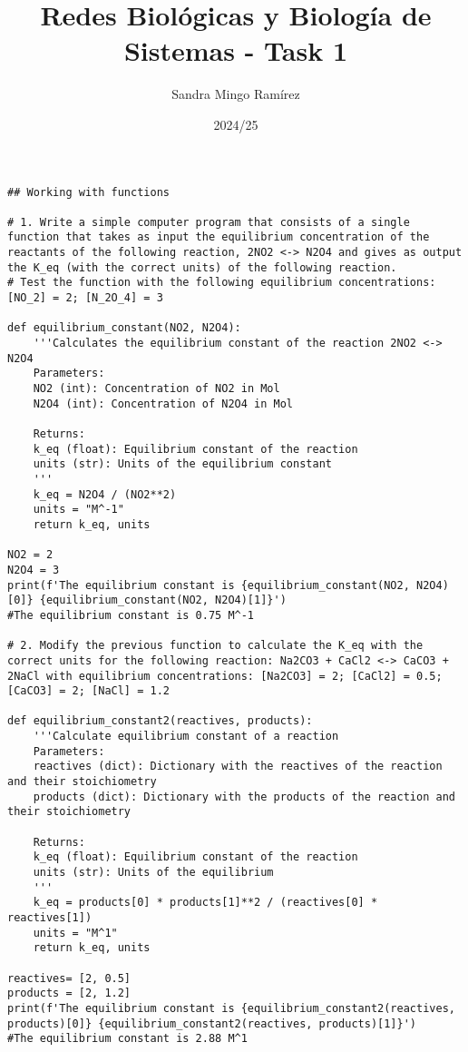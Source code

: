 \documentclass[nochap]{../config/ejercicios}
\title{Redes Biológicas y Biología de Sistemas - Task 1}
\author{Sandra Mingo Ramírez}
\date{2024/25}
\begin{document}
\maketitle

\begin{lstlisting}
## Working with functions

# 1. Write a simple computer program that consists of a single function that takes as input the equilibrium concentration of the reactants of the following reaction, 2NO2 <-> N2O4 and gives as output the K_eq (with the correct units) of the following reaction. 
# Test the function with the following equilibrium concentrations: [NO_2] = 2; [N_2O_4] = 3

def equilibrium_constant(NO2, N2O4):
    '''Calculates the equilibrium constant of the reaction 2NO2 <-> N2O4
    Parameters:
    NO2 (int): Concentration of NO2 in Mol
    N2O4 (int): Concentration of N2O4 in Mol

    Returns:
    k_eq (float): Equilibrium constant of the reaction
    units (str): Units of the equilibrium constant
    '''
    k_eq = N2O4 / (NO2**2)
    units = "M^-1"
    return k_eq, units

NO2 = 2
N2O4 = 3
print(f'The equilibrium constant is {equilibrium_constant(NO2, N2O4)[0]} {equilibrium_constant(NO2, N2O4)[1]}')
#The equilibrium constant is 0.75 M^-1

# 2. Modify the previous function to calculate the K_eq with the correct units for the following reaction: Na2CO3 + CaCl2 <-> CaCO3 + 2NaCl with equilibrium concentrations: [Na2CO3] = 2; [CaCl2] = 0.5; [CaCO3] = 2; [NaCl] = 1.2

def equilibrium_constant2(reactives, products):
    '''Calculate equilibrium constant of a reaction
    Parameters:
    reactives (dict): Dictionary with the reactives of the reaction and their stoichiometry
    products (dict): Dictionary with the products of the reaction and their stoichiometry

    Returns:
    k_eq (float): Equilibrium constant of the reaction
    units (str): Units of the equilibrium
    '''
    k_eq = products[0] * products[1]**2 / (reactives[0] * reactives[1])
    units = "M^1"
    return k_eq, units

reactives= [2, 0.5]
products = [2, 1.2]
print(f'The equilibrium constant is {equilibrium_constant2(reactives, products)[0]} {equilibrium_constant2(reactives, products)[1]}')
#The equilibrium constant is 2.88 M^1
\end{lstlisting}
\end{document}

